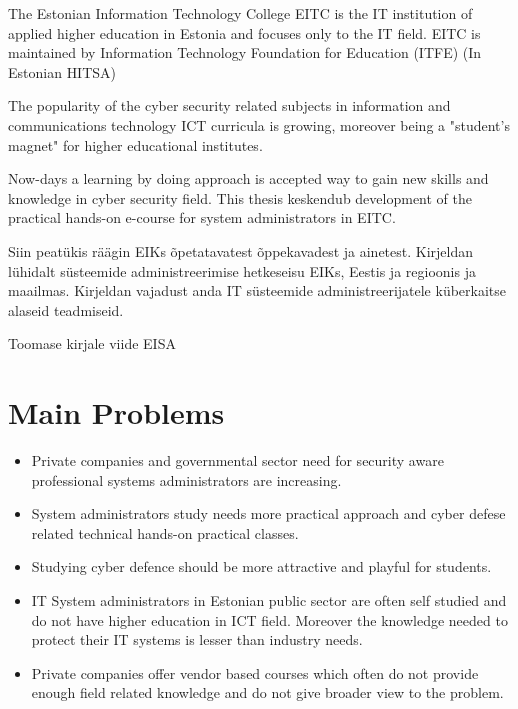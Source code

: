 The Estonian Information Technology College \gls{EITC} is the IT institution of applied higher education in Estonia and focuses only to the IT field.  \cite{EITC} \gls{EITC} is maintained by Information Technology Foundation for Education (\gls{ITFE}) (In Estonian  \gls{HITSA})

The popularity of the cyber security related subjects in information and communications technology \gls{ICT} curricula is growing, moreover being a "student's magnet" for higher educational institutes.\citep{CyberIsHot}

Now-days a learning by doing approach is accepted way to gain new skills and knowledge in cyber security field. This thesis keskendub development of the practical hands-on e-course for system administrators in \gls{EITC}.


  


Siin peatükis räägin EIKs õpetatavatest õppekavadest ja ainetest. Kirjeldan lühidalt süsteemide administreerimise hetkeseisu EIKs, Eestis ja regioonis ja maailmas. Kirjeldan vajadust anda IT süsteemide administreerijatele küberkaitse alaseid teadmiseid.





Toomase kirjale viide \gls{EISA}


\section{Main Problems}
\begin{itemize}
\item Private companies and governmental sector need for security aware professional systems administrators are increasing.
\item System administrators study needs more practical approach and cyber defese related technical hands-on practical classes.
\item Studying cyber defence should be more attractive and playful for students.
\item IT System administrators in Estonian public sector are often self studied  and do not have higher education in ICT field. Moreover the knowledge needed to protect their IT systems is lesser than industry needs.
\item Private companies offer vendor based courses which often do not provide enough field related knowledge and do not give broader view to the problem.
\end{itemize}

